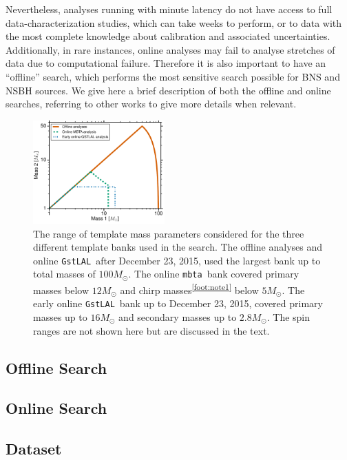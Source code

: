\documentclass[twocolumn]{aastex6}
\newcommand{\mbta}{\texttt{mbta}}
\newcommand{\gstlal}{\texttt{GstLAL}}
\begin{document}
Nevertheless, analyses running with minute latency do not have access to full
data-characterization studies, which can take weeks to perform, or to data with the most complete
knowledge about calibration and associated uncertainties. Additionally, in rare
instances, online analyses may fail to analyse stretches of data due to computational failure. Therefore it is also
important to have an ``offline'' search, which performs the most sensitive search possible
for \ac{BNS} and \ac{NSBH} sources.
We give here a brief description
of both the offline and online searches, referring to other works to give more details
when relevant.

\begin{figure}[t]
\centering
\includegraphics[width=0.45\textwidth]{figure1}
\caption{\label{fig:banks}The range of template mass parameters considered for the
three different template banks used in the search.
The offline analyses and online \gstlal\ after December 23, 2015, used the largest
bank up to total masses of $100 M_{\odot}$.
The online \mbta\ bank covered primary masses below $12 M_{\odot}$
and chirp masses\textsuperscript{\ref{foot:note1}} below
$5 M_{\odot}$. The early online \gstlal\ bank up to December 23, 2015, covered primary
masses up to $16 M_{\odot}$ and secondary masses up to $2.8 M_{\odot}$.
The spin ranges are not shown here but are discussed in the text. }
\end{figure}

  \subsection{Offline Search}
  \label{ssec:offline_searches}
  

  \subsection{Online Search}
  \label{ssec:online_searches}
  
  
  \subsection{Dataset}
  \label{ssec:dataset}
  
  
\end{document}
